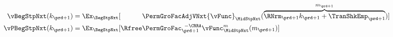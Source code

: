   \begin{equation}\begin{gathered}\begin{aligned}
        \vBegStpNxt({k}_{\prd+1})    & = \Ex_{\BegStpNxt}[\phantom{\Rfree}\PermGroFacAdjVNxt{\vFunc}_{\MidStpNxt}(\overbrace{\RNrm_{\prd+1}{k}_{\prd+1}+{\TranShkEmp}_{\prd+1}}^{{m}_{\prd+1}})] \label{eq:vFuncBegtpdefn} \\
        \vPBegStpNxt({k}_{\prd+1}) & = \Ex_{\BegStpNxt}[\Rfree \PermGroFac_{\prd+1}^{\phantom{1}-\CRRA} {\vFunc}_{\MidStpNxt}^{{m}}({m}_{\prd+1})]
      \end{aligned}\end{gathered}\end{equation}
